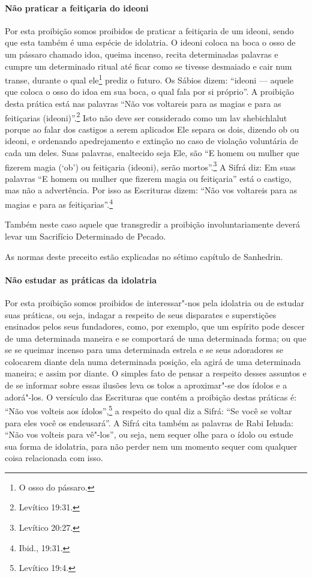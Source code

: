 \begin{multicols}{2}
\paragraph{Não praticar a feitiçaria do ideoni\starr}

Por esta proibição somos proibidos de praticar a feitiçaria de um
ideoni\starr, sendo que esta também é uma espécie de idolatria. O
ideoni\starr{} coloca na boca o osso de um pássaro chamado idoa\starr,
queima incenso, recita determinadas palavras e cumpre um determinado
ritual até ficar como se tivesse desmaiado e cair num transe, durante o
qual ele\footnote{O osso do pássaro.} prediz o futuro. Os Sábios dizem:
``ideoni\starr{} --- aquele que coloca o osso do idoa\starr{} em sua boca, o qual
fala por si próprio''. A proibição desta prática está nas palavras ``Não
vos voltareis para as magias e para as feitiçarias (ideoni\starr)''.\footnote{Levítico 19:31.} Isto não deve ser considerado como um lav shebichlalut\starr{} porque ao falar dos castigos a serem aplicados Ele separa
os dois, dizendo ob\starr{} ou ideoni\starr, e ordenando apedrejamento e
extinção no caso de violação voluntária de cada um deles. Suas palavras,
enaltecido seja Ele, são ``E homem ou mulher que fizerem magia (`ob') ou
feitiçaria (ideoni\starr), serão mortos''.\footnote{Levítico 20:27.} A Sifrá\starr{} diz: Em
suas palavras ``E homem ou mulher que fizerem magia ou feitiçaria'' está
o castigo, mas não a advertência. Por isso as Escrituras dizem: ``Não
vos voltareis para as magias e para as feitiçarias''.\footnote{Ibid., 19:31.}

Também neste caso aquele que transgredir a proibição involuntariamente
deverá levar um Sacrifício Determinado de Pecado.

As normas deste preceito estão explicadas no sétimo capítulo de Sanhedrin\starr.

\paragraph{Não estudar as práticas da idolatria}

Por esta proibição somos proibidos de interessar"-nos pela idolatria ou
de estudar suas práticas, ou seja, indagar a respeito de seus disparates
e superstições ensinados pelos seus fundadores, como, por exemplo, que
um espírito pode descer de uma determinada maneira e se comportará de
uma determinada forma; ou que se se queimar incenso para uma determinada
estrela e se seus adoradores se colocarem diante dela numa determinada
posição, ela agirá de uma determinada maneira; e assim por diante. O
simples fato de pensar a respeito desses assuntos e de se informar sobre
essas ilusões leva os tolos a aproximar"-se dos ídolos e a adorá"-los. O
versículo das Escrituras que contém a proibição destas práticas é:
``Não vos volteis aos ídolos'',\footnote{Levítico 19:4.} a respeito do qual diz a
Sifrá\starr: ``Se você se voltar para eles você os endeusará''. A Sifrá\starr{} cita
também as palavras de Rabi Iehuda\starr: ``Não vos volteis para vê"-los'', ou seja,
nem sequer olhe para o ídolo ou estude sua forma de idolatria, para não
perder nem um momento sequer com qualquer coisa relacionada com isso.


\end{multicols}
